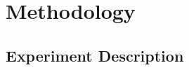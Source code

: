 \documentclass[paper=letter, fontsize=10pt]{scrartcl} %
\begin{document}
\section{Methodology}
\subsection{Experiment Description}




\end{document}
